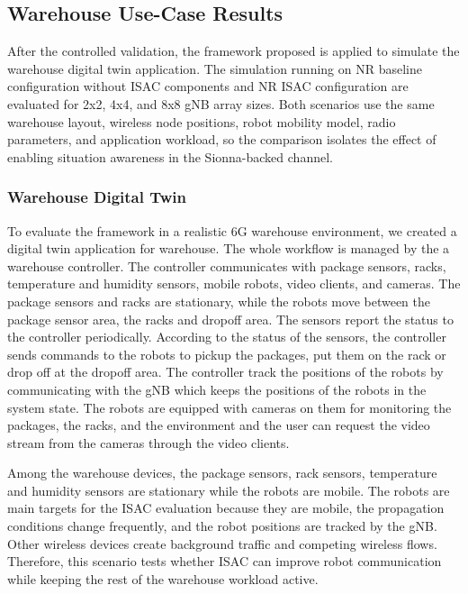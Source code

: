 \subsection{Warehouse Use-Case Results}
\label{subsec:warehouse_usecase_results}

After the controlled validation, the framework proposed is applied to simulate the warehouse digital twin application.
The simulation running on NR baseline configuration without ISAC components and NR ISAC configuration are evaluated for 2x2, 4x4, and 8x8 gNB array sizes.
Both scenarios use the same warehouse layout, wireless node positions, robot mobility model, radio parameters, and application workload, so the comparison isolates the effect of enabling situation awareness in the Sionna-backed channel.

\subsubsection{Warehouse Digital Twin}

To evaluate the framework in a realistic 6G warehouse environment, we created a digital twin application for warehouse.
The whole workflow is managed by the a warehouse controller.
The controller communicates with package sensors, racks, temperature and humidity sensors, mobile robots, video clients, and cameras.
The package sensors and racks are stationary, while the robots move between the package sensor area, the racks and dropoff area.
The sensors report the status to the controller periodically.
According to the status of the sensors, the controller sends commands to the robots to pickup the packages, put them on the rack or drop off at the dropoff area.
The controller track the positions of the robots by communicating with the gNB which keeps the positions of the robots in the system state.
The robots are equipped with cameras on them for monitoring the packages, the racks, and the environment and the user can request the video stream from the cameras through the video clients.

Among the warehouse devices, the package sensors, rack sensors, temperature and humidity sensors are stationary while the robots are mobile.
The robots are main targets for the ISAC evaluation because they are mobile, the propagation conditions change frequently, and the robot positions are tracked by the gNB.
Other wireless devices create background traffic and competing wireless flows.
Therefore, this scenario tests whether ISAC can improve robot communication while keeping the rest of the warehouse workload active.

